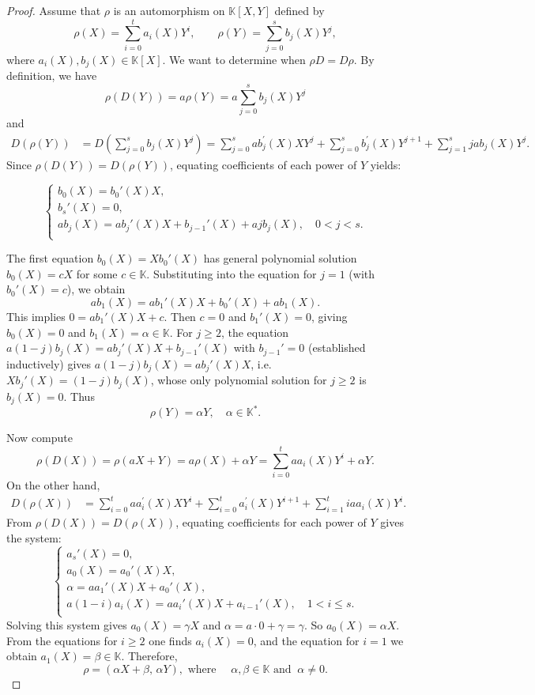 \documentclass[11pt,a4paper,reqno]{amsart}
\begin{document}
\begin{proof}
Assume that $\rho$ is an automorphism on $\mathbb{K}[X,Y]$ defined by
\[
\rho(X) = \sum_{i=0}^t a_i(X) Y^i, \qquad \rho(Y) = \sum_{j=0}^s b_j(X) Y^j,
\]
where  $a_i(X), b_j(X) \in \mathbb{K}[X]$. We want to determine when $\rho D = D \rho$. By definition, we have
\[
\rho(D(Y)) = a \rho(Y) = a \sum_{j=0}^s b_j(X) Y^j
\]
and
\begin{align*}
D(\rho(Y)) 
&= D\left( \sum_{j=0}^s b_j(X) Y^j \right)
=\sum_{j=0}^sab_j^{'}(X)XY^j+\sum_{j=0}^sb_j^{'}(X)Y^{j+1} + \sum_{j=1}^sjab_j(X) Y^j.
\end{align*}
Since $\rho(D(Y)) = D(\rho(Y))$, equating coefficients of each power of $Y$ yields:

\begin{equation*}
    \begin{cases} 
    b_0(X) = b_0'(X) X,\\
    b_s'(X) = 0, \\ 
   a b_j(X) =  a b_j'(X) X + b_{j-1}'(X) + ajb_j(X), \quad 0<j<s.\\
    \end{cases}
    \end{equation*}

The first equation $b_0(X)=Xb_0'(X)$ has general polynomial solution $b_0(X)=cX$ for some $c\in\mathbb{K}$. Substituting into the equation for $j=1$ (with $b_0'(X)=c$), we obtain  
\[
ab_1(X) = ab_1'(X)X + b_0'(X) + ab_1(X). 
\]
This implies  $0 = ab_1'(X)X + c$. Then $c=0$ and $b_1'(X)=0$, giving $b_0(X)=0$ and $b_1(X)=\alpha\in\mathbb{K}$. For $j\geq 2$, the equation $a(1-j)b_j(X) = ab_j'(X)X + b_{j-1}'(X)$ with $b_{j-1}'=0$ (established inductively) gives $a(1-j)b_j(X)=ab_j'(X)X$, i.e.\ $Xb_j'(X)=(1-j)b_j(X)$, whose only polynomial solution for $j\geq 2$ is $b_j(X)=0$. Thus
\[
\rho(Y) = \alpha Y, \quad \alpha \in \mathbb{K}^*.
\]

Now compute 
\[
\rho(D(X)) = \rho(aX + Y) = a \rho(X) + \alpha Y=\sum_{i=0}^t aa_i(X) Y^i+\alpha Y.
\]
On the other hand,
\begin{align*}
D(\rho(X)) 
&= \sum_{i=0}^t aa_i^{'}(X)XY^i+\sum_{i=0}^t a_i^{'}(X)Y^{i+1} + \sum_{i=1}^t iaa_i(X)Y^i.
\end{align*}
From $\rho(D(X))=D(\rho(X))$, equating coefficients for each power of $Y$ gives the system:
\begin{equation*} 
    \begin{cases}
    a_s'(X) = 0,\\
    a_0(X) = a_0'(X) X,\\
    \alpha = a a_1'(X) X + a_0'(X), \\ 
   a(1-i) a_i(X) = a a_i'(X) X + a_{i-1}'(X), \quad 1<i\leq s.\\
    \end{cases}
    \end{equation*}
Solving this system gives $a_0(X)=\gamma X$ and  $\alpha = a\cdot 0 + \gamma = \gamma$. So $a_0(X)=\alpha X$. From the equations for $i\geq 2$ one finds $a_i(X)=0$, and the  equation for $i=1$ we obtain $a_1(X)=\beta\in\mathbb{K}$. Therefore, 
\[
\rho=(\alpha X + \beta, \, \alpha Y ), \mbox{ where } \quad \alpha,\beta \in \mathbb{K} \mbox{ and }\ \alpha\neq 0.
\]
\end{proof}
\end{document}
